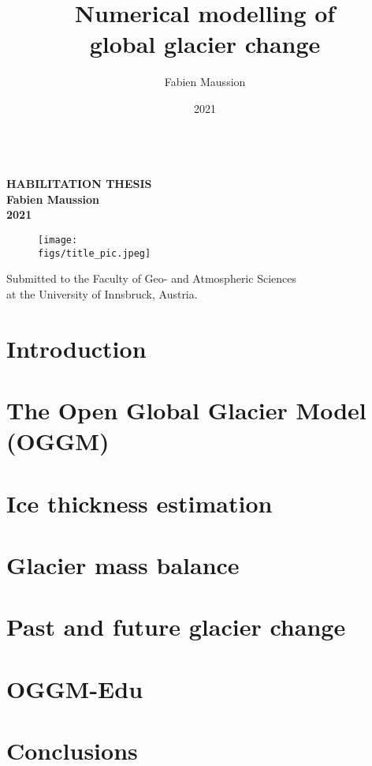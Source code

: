 \documentclass[twoside,10pt,openright]{scrbook} %
\author{Fabien Maussion}
\title{Numerical modelling of \\ global glacier change}
\subtitle{}
\date{2021}
\makeatletter
\newcommand{\figs}{../habil/img}
\renewcommand{\maketitle}{\begin{titlepage}%
  
	\begin{center}
	  	\vspace*{0cm}
		\Huge \bfseries \MakeUppercase{\@title} \mdseries \\[1.5cm]
				
		\Large \MakeUppercase{Habilitation thesis} \\	[1cm]		
		\Large Fabien Maussion \\	[0.1cm]		
		\large 2021 \\ [4.5cm]

		\begin{figure}[h!]
		\texttt{[image: \\figs/title\_pic.jpeg]} \\ [3cm]
		\end{figure}

		\large Submitted to the Faculty of Geo- and Atmospheric Sciences \\ at the University of Innsbruck, Austria.
	\end{center}
  \end{titlepage}%
  \setcounter{footnote}{0}%
}
\makeatother
\begin{document}
\maketitle

\frontmatter



\cleardoublepage
\renewcommand*\contentsname{Table of contents}
\tableofcontents

\mainmatter

\chapter{Introduction}
\label{chap1}



\chapter{The Open Global Glacier Model (OGGM)}
\label{chap2}




\chapter{Ice thickness estimation}
\label{chap3}



\chapter{Glacier mass balance}
\label{chap4}

\chapter{Past and future glacier change}
\label{chap5}

\chapter{OGGM-Edu}
\label{chap6}

\chapter{Conclusions}
\label{chap7}




%
%
%
%
%
%
%
%

%
%
%
%
%

\cleardoublepage{}


\end{document}
